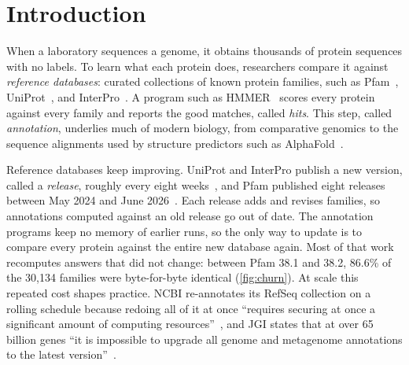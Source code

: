 \documentclass[letterpaper,twocolumn,10pt]{article}
\theoremstyle{definition}
\begin{document}
\section{Introduction}
\label{sec:intro}

When a laboratory sequences a genome, it obtains thousands of protein sequences with no labels. To learn what
each protein does, researchers compare it against \textit{reference databases}: curated collections of known
protein families, such as Pfam~\cite{pfam2025}, UniProt~\cite{uniprot2025}, and InterPro~\cite{paysanlafosse2023interpro}.
A program such as HMMER~\cite{eddy2011hmmer} scores every protein against every family and reports the good
matches, called \textit{hits}. This step, called \textit{annotation}, underlies much of modern biology, from
comparative genomics to the sequence alignments used by structure predictors such as AlphaFold~\cite{jumper2021alphafold}.

Reference databases keep improving. UniProt and InterPro publish a new version, called a \textit{release},
roughly every eight weeks~\cite{uniprot2025,paysanlafosse2023interpro}, and Pfam published eight releases
between May 2024 and June 2026~\cite{pfam382relnotes}. Each release adds and revises families, so annotations
computed against an old release go out of date. The annotation programs keep no memory of earlier runs,
so the only way to update is to compare every protein against the entire new database again. Most of that
work recomputes answers that did not change: between Pfam 38.1 and 38.2, 86.6\% of the 30{,}134 families were
byte\nobreakdash-for\nobreakdash-byte identical (\cref{fig:churn}). At scale this repeated cost shapes practice. NCBI re\nobreakdash-annotates its
RefSeq collection on a rolling schedule because redoing all of it at once ``requires securing at once a
significant amount of computing resources''~\cite{li2021refseq}, and JGI states that at over 65 billion genes
``it is impossible to upgrade all genome and metagenome annotations to the latest version''~\cite{chen2021img}.
\end{document}

